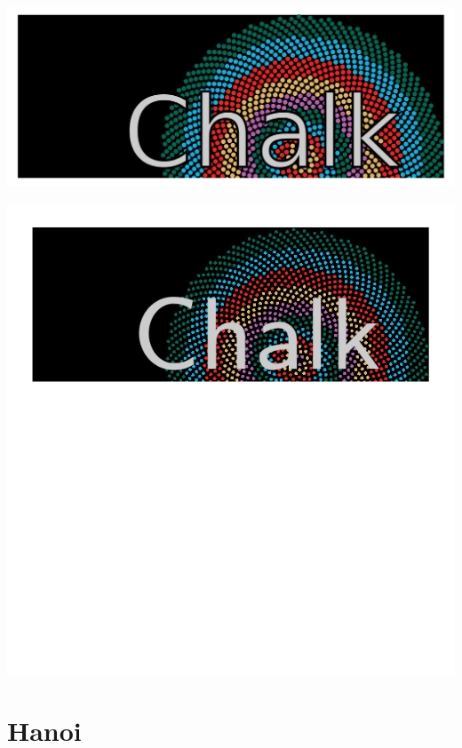 \documentclass{article}%
\begin{document}
\includegraphics[width=\textwidth]{examples/output/logo.png}

\includegraphics[width=\textwidth]{examples/output/logo.pdf}
\pagebreak


\section{Hanoi}
\end{document}
